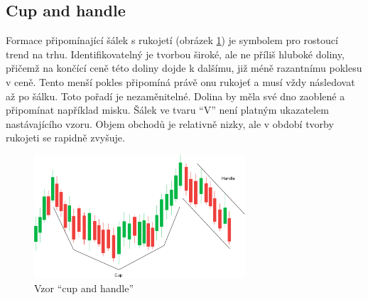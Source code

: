 \subsection{Cup and handle}
Formace připomínající šálek s rukojetí (obrázek \ref{fig:cup-n-handle}) je symbolem pro rostoucí trend na trhu. Identifikovatelný je tvorbou široké, ale ne příliš hluboké doliny, přičemž na končící ceně této doliny dojde k
dalšímu, již méně razantnímu poklesu v ceně. Tento menší pokles připomíná právě onu rukojeť a musí vždy následovat až po šálku. Toto pořadí je nezaměnitelné. Dolina by měla své dno
zaoblené a připomínat například misku. Šálek ve tvaru \enquote{V} není platným ukazatelem nastávajícího vzoru. Objem obchodů je relativně nizky, ale v období tvorby rukojeti se rapidně zvyšuje.
\begin{figure}[htb]
    \centering
    \includegraphics[width=0.7\textwidth]{Figures/Cup-n-handle.pdf}
    \caption{Vzor \enquote{cup and handle}}
    \label{fig:cup-n-handle}
\end{figure}

